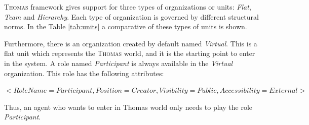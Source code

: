 \textsc{Thomas} framework gives support for three types of organizations or units: \textit{Flat}, \textit{Team} and \textit{Hierarchy}. Each type of organization is governed by different structural norms. In the Table \ref{tab:units} a comparative of these types of units is shown. 

Furthermore, there is an organization created by default named \textit{Virtual}. This is a flat unit which represents the \textsc{Thomas} world, and it is the starting point to enter in the system. A role named \textit{Participant} is always available in the \textit{Virtual} organization. This role has the following attributes:

 $<RoleName = Participant, Position = Creator, Visibility = Public, Accessibility = External>$
 
Thus, an agent who wants to enter in Thomas world only needs to play the role \textit{Participant}. 
 


